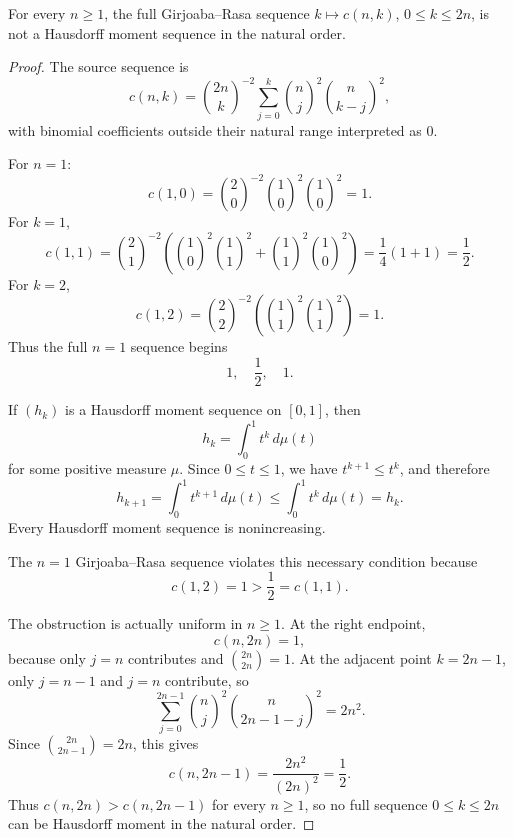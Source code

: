 \begin{lemma}[Girjoaba Rasa c(n,k) full sequence not Hausdorff for any n>=1]
\label{res:gr-cnk-full-sequence-not-hausdorff-any-n}
For every \(n\ge1\), the full Girjoaba--Rasa sequence \(k\mapsto c(n,k)\), \(0\le k\le2n\), is not a Hausdorff moment sequence in the natural order.
\end{lemma}
\begin{proof}
The source sequence is
\[
c(n,k)=\binom{2n}{k}^{-2}
\sum_{j=0}^k \binom{n}{j}^2\binom{n}{k-j}^2,
\]
with binomial coefficients outside their natural range interpreted as \(0\).

For \(n=1\):
\[
c(1,0)=\binom20^{-2}\binom10^2\binom10^2=1.
\]
For \(k=1\),
\[
c(1,1)=\binom21^{-2}
\left(\binom10^2\binom11^2+\binom11^2\binom10^2\right)
=\frac14(1+1)=\frac12.
\]
For \(k=2\),
\[
c(1,2)=\binom22^{-2}
\left(\binom11^2\binom11^2\right)=1.
\]
Thus the full \(n=1\) sequence begins
\[
1,\quad \frac12,\quad 1.
\]

If \((h_k)\) is a Hausdorff moment sequence on \([0,1]\), then
\[
h_k=\int_0^1 t^k\,d\mu(t)
\]
for some positive measure \(\mu\).  Since \(0\le t\le1\), we have \(t^{k+1}\le t^k\), and therefore
\[
h_{k+1}=\int_0^1 t^{k+1}\,d\mu(t)
\le
\int_0^1 t^k\,d\mu(t)=h_k.
\]
Every Hausdorff moment sequence is nonincreasing.

The \(n=1\) Girjoaba--Rasa sequence violates this necessary condition because
\[
c(1,2)=1>\frac12=c(1,1).
\]

The obstruction is actually uniform in \(n\ge1\).  At the right endpoint,
\[
c(n,2n)=1,
\]
because only \(j=n\) contributes and \(\binom{2n}{2n}=1\).  At the adjacent point \(k=2n-1\), only \(j=n-1\) and \(j=n\) contribute, so
\[
\sum_{j=0}^{2n-1}\binom{n}{j}^2\binom{n}{2n-1-j}^2
=2n^2.
\]
Since \(\binom{2n}{2n-1}=2n\), this gives
\[
c(n,2n-1)=\frac{2n^2}{(2n)^2}=\frac12.
\]
Thus \(c(n,2n)>c(n,2n-1)\) for every \(n\ge1\), so no full sequence \(0\le k\le2n\) can be Hausdorff moment in the natural order.
\end{proof}

